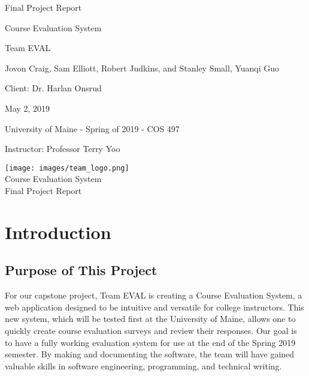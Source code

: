 \documentclass{article}
\begin{document}
\begin{titlepage}


\centering
\vspace*{2cm}
{\Huge Final Project Report\par}
\vspace{.25cm}
{\LARGE Course Evaluation System\par}
\vspace{1cm}
{\Large Team EVAL\par}
\vspace{.2cm}
{\Large Jovon Craig, Sam Elliott, Robert Judkins, and Stanley Small, Yuanqi Guo\par}
\vspace{1cm}
{\Large Client: Dr. Harlan Onsrud\par}
\vspace{1cm}
{\Large May 2, 2019\par}
\vspace{11cm}

University of Maine - Spring of 2019 - COS 497

Instructor: Professor Terry Yoo

\end{titlepage}

\newpage

\begin{center}
{\texttt{[image: images/team\_logo.png]}} \\ 	\bigskip
{\LARGE Course Evaluation System } \\ \medskip
{\large Final Project Report } \\ \medskip
\end{center}

\tableofcontents

\newpage

\section{Introduction}

\subsection{Purpose of This Project}

For our capstone project, Team EVAL is creating a Course Evaluation System, a web application designed to be intuitive and versatile for college instructors. This new system, which will be tested first at the University of Maine, allows one to quickly create course evaluation surveys and review their responses. Our goal is to have a fully working evaluation system for use at the end of the Spring 2019 semester. By making and documenting the software, the team will have gained valuable skills in software engineering, programming, and technical writing.
\end{document}
